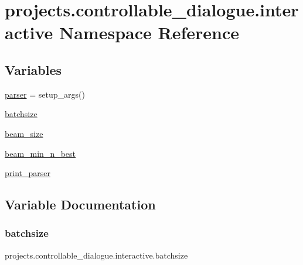 \hypertarget{namespaceprojects_1_1controllable__dialogue_1_1interactive}{}\section{projects.\+controllable\+\_\+dialogue.\+interactive Namespace Reference}
\label{namespaceprojects_1_1controllable__dialogue_1_1interactive}
\subsection*{Variables}
\begin{DoxyCompactItemize}
\item 
\hyperlink{namespaceprojects_1_1controllable__dialogue_1_1interactive_afe1a4872b1de35e52af71e5f090a0046}{parser} = setup\+\_\+args()
\item 
\hyperlink{namespaceprojects_1_1controllable__dialogue_1_1interactive_a28b16537759180e8ce8df2cb1ed0b8d2}{batchsize}
\item 
\hyperlink{namespaceprojects_1_1controllable__dialogue_1_1interactive_a68998be1e061b709e2eee7616aaf5cbc}{beam\+\_\+size}
\item 
\hyperlink{namespaceprojects_1_1controllable__dialogue_1_1interactive_a6242c6afeaa8e797ca8162736039d4b9}{beam\+\_\+min\+\_\+n\+\_\+best}
\item 
\hyperlink{namespaceprojects_1_1controllable__dialogue_1_1interactive_a0e7164399f15c542699dd4048b32aec6}{print\+\_\+parser}
\end{DoxyCompactItemize}


\subsection{Variable Documentation}
\mbox{\label{namespaceprojects_1_1controllable__dialogue_1_1interactive_a28b16537759180e8ce8df2cb1ed0b8d2}} 
\subsubsection{\texorpdfstring{batchsize}{batchsize}}
{\footnotesize\ttfamily projects.\+controllable\+\_\+dialogue.\+interactive.\+batchsize}

